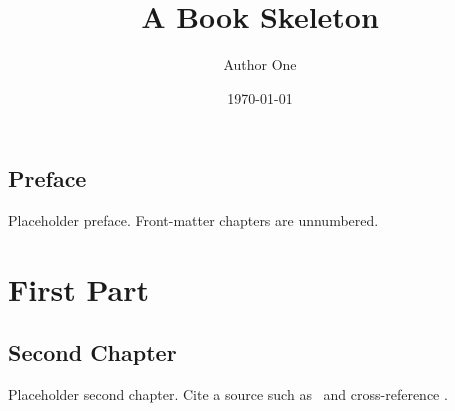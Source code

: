 \documentclass[11pt,a4paper,openright]{book}
\title{A Book Skeleton}
\author{Author One}
\date{\today}
\begin{document}
\frontmatter
\maketitle
\tableofcontents

\chapter{Preface}
Placeholder preface. Front-matter chapters are unnumbered.

\mainmatter

\part{First Part}
\label{part:first}



\chapter{Second Chapter}
\label{ch:second}
Placeholder second chapter. Cite a source such as~\cite{placeholder-book}
and cross-reference .

\backmatter

\printbibliography[heading=bibintoc]

\end{document}
